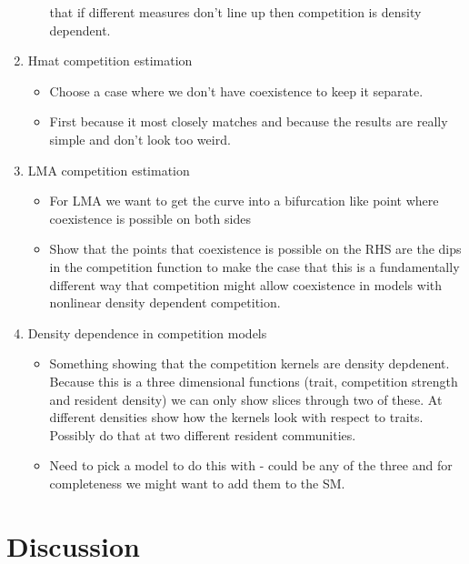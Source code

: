\documentclass[a4paper,11pt]{article}
\begin{document}
\begin{enumerate}
\begin{itemize}
    that if different measures don't line up then competition is
    density dependent.
  \end{itemize}
\item Hmat competition estimation
  \begin{itemize}
  \item Choose a case where we don't have coexistence to keep it
    separate.
  \item First because it most closely matches \citet{Kisdi-1999} and
    because the results are really simple and don't look too weird.
  \end{itemize}
\item LMA competition estimation
  \begin{itemize}
  \item For LMA we want to get the curve into a bifurcation like point
    where coexistence is possible on both sides
  \item Show that the points that coexistence is possible on the RHS
    are the dips in the competition function to make the case that
    this is a fundamentally different way that competition might allow
    coexistence in models with nonlinear density dependent
    competition.
  \end{itemize}
\item Density dependence in competition models
  \begin{itemize}
  \item Something showing that the competition kernels are density
    depdenent.  Because this is a three dimensional functions (trait,
    competition strength and resident density) we can only show slices
    through two of these.  At different densities show how the
    kernels look with respect to traits.  Possibly do that at two
    different resident communities.
  \item Need to pick a model to do this with - could be any of the
    three and for completeness we might want to add them to the SM.
  \end{itemize}
\end{enumerate}

\clearpage
\section{Discussion}
\end{document}
